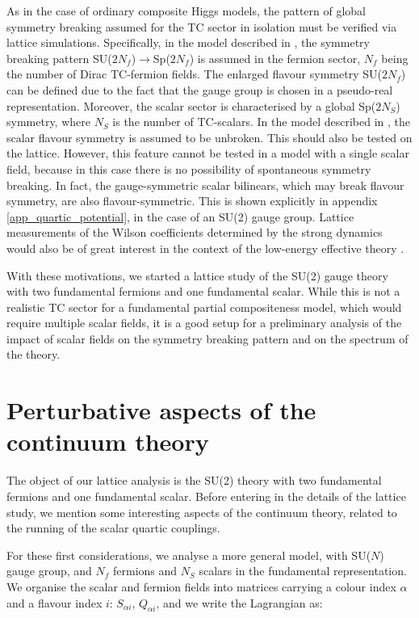 As in the case of ordinary composite Higgs models, the pattern of global symmetry breaking assumed for the TC sector in isolation must be verified via lattice simulations. Specifically, in the model described in \cite{Cacciapaglia:2017cdi}, the symmetry breaking pattern SU($2N_f$)$\to$Sp($2N_f$) is assumed in the fermion sector, $N_f$ being the number of Dirac TC-fermion fields. The enlarged flavour symmetry SU($2N_f$) can be defined due to the fact that the gauge group is chosen in a pseudo-real representation. Moreover, the scalar sector is characterised by a global Sp($2N_S$) symmetry, where $N_S$ is the number of TC-scalars. In the model described in \cite{Cacciapaglia:2017cdi}, the scalar flavour symmetry is assumed to be unbroken. This should also be tested on the lattice. However, this feature cannot be tested in a model with a single scalar field, because in this case there is no possibility of spontaneous symmetry breaking. In fact, the gauge-symmetric scalar bilinears, which may break flavour symmetry, are also flavour-symmetric. This is shown explicitly in appendix \ref{app_quartic_potential}, in the case of an SU(2) gauge group. Lattice measurements of the Wilson coefficients determined by the strong dynamics would also be of great interest in the context of the low-energy effective  theory \cite{Cacciapaglia:2017cdi}. 

With these motivations, we started a lattice study of the SU(2) gauge theory with two fundamental fermions and one fundamental scalar. While this is not a realistic TC sector for a fundamental partial compositeness model, which would require multiple scalar fields, it is a good setup for a preliminary analysis of the impact of scalar fields on the symmetry breaking pattern and on the spectrum of the theory.



\section{Perturbative aspects of the continuum theory}
\label{running_lambda}

The object of our lattice analysis is the SU(2) theory with two fundamental fermions and one fundamental scalar. Before entering in the details of the lattice study, we mention some  interesting aspects of the continuum theory, related to the running of the scalar quartic couplings. 

For these first considerations, we analyse a more general model, with SU($N$) gauge group, and $N_f$ fermions and $N_S$ scalars in the fundamental representation.
We organise the scalar and fermion fields into matrices carrying a colour index $\alpha$ and a flavour index $i$: $S_{\alpha i}$, $Q_{\alpha i}$, and we write the Lagrangian as:

